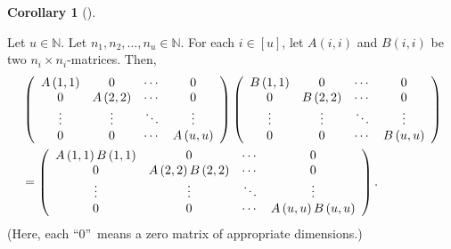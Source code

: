 \documentclass[numbers=enddot,12pt,final,onecolumn,notitlepage]{scrartcl}%
\numberwithin{exer}{subsection}
\theoremstyle{definition}
\newtheorem{coro}[theo]{Corollary}
\newenvironment{corollary}[1][]
{\begin{coro}[#1]\begin{leftbar}}
{\end{leftbar}\end{coro}}
\begin{document}
\begin{corollary}
\label{cor.blockmatrix.mult-diag}Let $u\in\mathbb{N}$. Let $n_{1},n_{2}%
,\ldots,n_{u}\in\mathbb{N}$. For each $i\in\left[  u\right]  $, let $A\left(
i,i\right)  $ and $B\left(  i,i\right)  $ be two $n_{i}\times n_{i}$-matrices.
Then,%
\begin{align*}
&  \left(
\begin{array}
[c]{cccc}%
A\left(  1,1\right)  & 0 & \cdots & 0\\
0 & A\left(  2,2\right)  & \cdots & 0\\
\vdots & \vdots & \ddots & \vdots\\
0 & 0 & \cdots & A\left(  u,u\right)
\end{array}
\right)  \left(
\begin{array}
[c]{cccc}%
B\left(  1,1\right)  & 0 & \cdots & 0\\
0 & B\left(  2,2\right)  & \cdots & 0\\
\vdots & \vdots & \ddots & \vdots\\
0 & 0 & \cdots & B\left(  u,u\right)
\end{array}
\right) \\
&  =\left(
\begin{array}
[c]{cccc}%
A\left(  1,1\right)  B\left(  1,1\right)  & 0 & \cdots & 0\\
0 & A\left(  2,2\right)  B\left(  2,2\right)  & \cdots & 0\\
\vdots & \vdots & \ddots & \vdots\\
0 & 0 & \cdots & A\left(  u,u\right)  B\left(  u,u\right)
\end{array}
\right)  .
\end{align*}
(Here, each \textquotedblleft$0$\textquotedblright\ means a zero matrix of
appropriate dimensions.)
\end{corollary}
\end{document}
